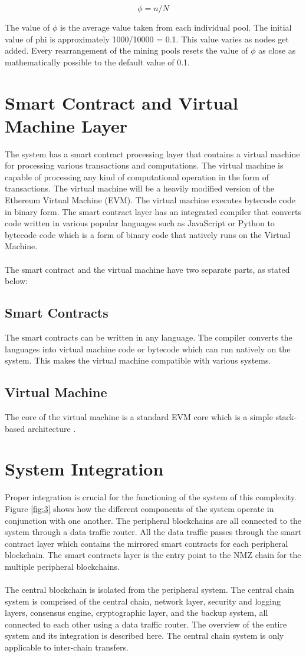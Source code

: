 \documentclass[a4paper,twoside,phd]{BYUPhys}
\begin{document}
\[\phi = n/N\]

The value of $\phi$ is the average value taken from each individual pool. The initial value of phi is approximately 1000/10000 = 0.1. This value varies as nodes get added. Every rearrangement of the mining pools resets the value of $\phi$ as close as mathematically possible to the default value of 0.1.


\section{Smart Contract and Virtual Machine Layer} 
The system has a smart contract processing layer that contains a virtual machine for processing various transactions and computations. The virtual machine is capable of processing any kind of computational operation in the form of transactions. The virtual machine will be a heavily modified version of the Ethereum Virtual Machine (EVM). The virtual machine executes bytecode code in binary form. The smart contract layer has an integrated compiler that converts code written in various popular languages such as JavaScript or Python to bytecode code which is a form of binary code that natively runs on the Virtual Machine.
\\
\\
The smart contract and the virtual machine have two separate parts, as stated below:
\subsection{Smart Contracts}
The smart contracts can be written in any language. The compiler converts the languages into virtual machine code or bytecode which can run natively on the system. This makes the virtual machine compatible with various systems.
\subsection{Virtual Machine}
The core of the virtual machine is a standard EVM core which is a simple stack-based architecture \cite{Wood2018ETHEREUM:LEDGER}. 
\section{System Integration}
 Proper integration is crucial for the functioning of the system of this complexity. Figure \ref{fig:3} shows how the different components of the system operate in conjunction with one another. The peripheral blockchains are all connected to the system through a data traffic router. All the data traffic passes through the smart contract layer which contains the mirrored smart contracts for each peripheral blockchain. The smart contracts layer is the entry point to the NMZ chain for the multiple peripheral blockchains.
\\
\\
The central blockchain is isolated from the peripheral system. The central chain system is comprised of the central chain, network layer, security and logging layers, consensus engine, cryptographic layer, and the backup system, all connected to each other using a data traffic router. The overview of the entire system and its integration is described here. The central chain system is only applicable to inter-chain transfers.
\end{document}
